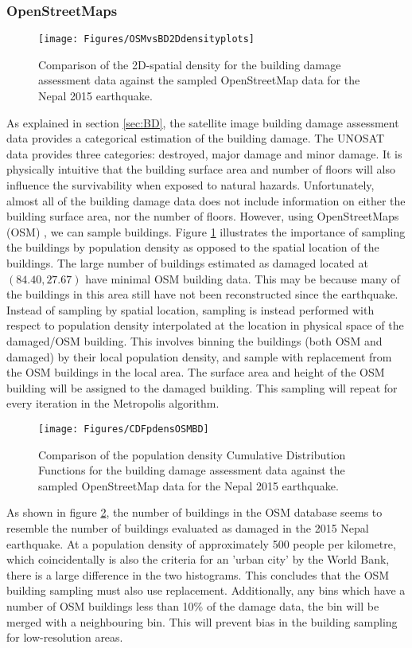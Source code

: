 \documentclass[10pt,a4paper]{article}
\begin{document}
\begin{multicols}{1}
\subsubsection{OpenStreetMaps}\label{sec:OSM}
\begin{figure}[H]
   \texttt{[image: Figures/OSMvsBD2Ddensityplots]}
 	\caption{Comparison of the 2D-spatial density for the building damage assessment data against the sampled OpenStreetMap data for the Nepal 2015 earthquake.}
 	\label{fig:OSMvsBD2D}
\end{figure}
As explained in section \ref{sec:BD}, the satellite image building damage assessment data provides a categorical estimation of the building damage. The UNOSAT data provides three categories: destroyed, major damage and minor damage. It is physically intuitive that the building surface area and number of floors will also influence the survivability when exposed to natural hazards. Unfortunately, almost all of the building damage data does not include information on either the building surface area, nor the number of floors. However, using OpenStreetMaps (OSM) \cite{OSM}, we can sample buildings. Figure \ref{fig:OSMvsBD2D} illustrates the importance of sampling the buildings by population density as opposed to the spatial location of the buildings. The large number of buildings estimated as damaged located at $(84.40,27.67)$ have minimal OSM building data. This may be because many of the buildings in this area still have not been reconstructed since the earthquake. Instead of sampling by spatial location, sampling is instead performed with respect to population density interpolated at the location in physical space of the damaged/OSM building. This involves binning the buildings (both OSM and damaged) by their local population density, and sample with replacement from the OSM buildings in the local area. The surface area and height of the OSM building will be assigned to the damaged building. This sampling will repeat for every iteration in the Metropolis algorithm.
\begin{figure}[H]
   \texttt{[image: Figures/CDFpdensOSMBD]}
 	\caption{Comparison of the population density Cumulative Distribution Functions for the building damage assessment data against the sampled OpenStreetMap data for the Nepal 2015 earthquake.}
 	\label{fig:OSMvsBD}
\end{figure}
As shown in figure \ref{fig:OSMvsBD}, the number of buildings in the OSM database seems to resemble the number of buildings evaluated as damaged in the 2015 Nepal earthquake. At a population density of approximately 500 people per kilometre, which coincidentally is also the criteria for an 'urban city' by the World Bank, there is a large difference in the two histograms. This concludes that the OSM building sampling must also use replacement. Additionally, any bins which have a number of OSM buildings less than 10\% of the damage data, the bin will be merged with a neighbouring bin. This will prevent bias in the building sampling for low-resolution areas.

\end{multicols}
\end{document}
